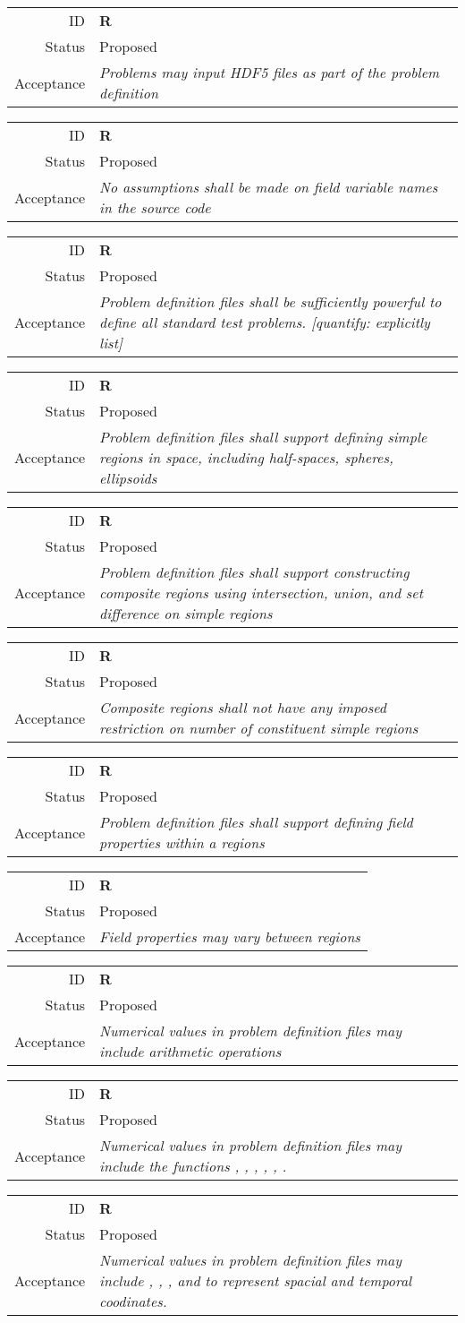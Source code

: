 \documentclass{book}
\newcommand{\req}[3]{
\begin{tabular}{rl}
ID & \textbf{R#1} \\
Status & \textsf{#2} \\
Acceptance & \textit{#3}
\end{tabular}
}
\begin{document}
\req
  {}
  {Proposed}
%
  {Problems may input HDF5 files as part of the problem definition}

\req
  {}
  {Proposed}
%
  {No assumptions shall be made on field variable names in the source
  code}

\req
  {}
  {Proposed}
%
  {Problem definition files shall be sufficiently powerful to define
  all standard test problems. [quantify: explicitly list]}

\req
  {}
  {Proposed}
%
  {Problem definition files shall support defining simple regions in
  space, including half-spaces, spheres, ellipsoids}

\req
  {}
  {Proposed}
%
  {Problem definition files shall support constructing composite
  regions using intersection, union, and set difference on simple
  regions}

\req
  {}
  {Proposed}
%
  {Composite regions shall not have any imposed restriction on number
  of constituent simple regions}

\req
  {}
  {Proposed}
%
  {Problem definition files shall support defining field properties
  within a regions}

\req
  {}
  {Proposed}
%
  {Field properties may vary between regions}

\req
  {}
  {Proposed}
%
  {Numerical values in problem definition files may include arithmetic
  operations}

\req
  {}
  {Proposed}
%
  {Numerical values in problem definition files may include the
  functions \code{log}, \code{exp}, \code{sin}, \code{cos},
  \code{min}, \code{max}.}

\req
  {}
  {Proposed}
%
  {Numerical values in problem definition files may include \code{x},
  \code{y}, \code{z}, and \code{t} to represent spacial and temporal
  coodinates.}
\end{document}
